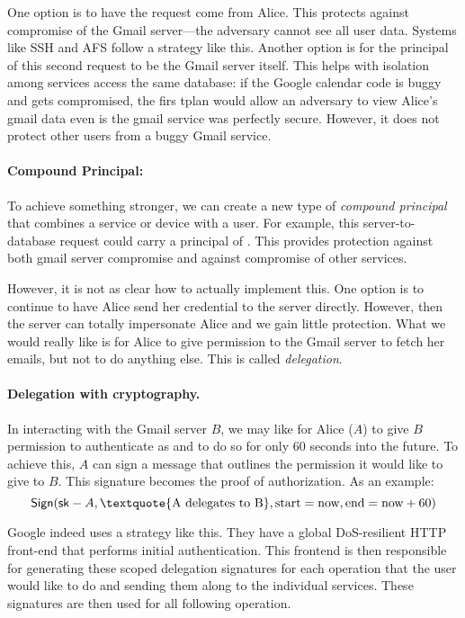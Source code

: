 One option is to have the request come from Alice. This protects against compromise of the Gmail server---the adversary cannot see all user data. Systems like SSH and AFS follow a strategy like this. Another option is for the principal of this second request to be the Gmail server itself. This helps with isolation among services access the same database: if the Google calendar code is buggy and gets compromised, the firs tplan would allow an adversary to view Alice's gmail data even is the gmail service was perfectly secure. However, it does not protect other users from a buggy Gmail service.

\paragraph{Compound Principal: }
To achieve something stronger, we can create a new type of \emph{compound principal} that combines a service or device with a user. For example, this server-to-database request could carry a principal of . This provides protection against both gmail server compromise and against compromise of other services.

However, it is not as clear how to actually implement this. One option is to continue to have Alice send her credential to the server directly. However, then the server can totally impersonate Alice and we gain little protection. What we would really like is for Alice to give permission to the Gmail server to fetch her emails, but not to do anything else. This is called \emph{delegation}.

\paragraph{Delegation with cryptography.}
In interacting with the Gmail server $B$, we may like for Alice ($A$) to give $B$ permission to authenticate as  and to do so for only 60 seconds into the future. To achieve this, $A$ can sign a message that outlines the permission it would like to give to $B$. This signature becomes the proof of authorization. As an example:
\[ \Sign(\sk-A, \text{\textquote{A delegates to B}}, \text{start}=\text{now}, \text{end}=\text{now}+60) \]

Google indeed uses a strategy like this. They have a global DoS-resilient HTTP front-end that performs initial authentication. This frontend is then responsible for generating these scoped delegation signatures for each operation that the user would like to do and sending them along to the individual services. These signatures are then used for all following operation.


